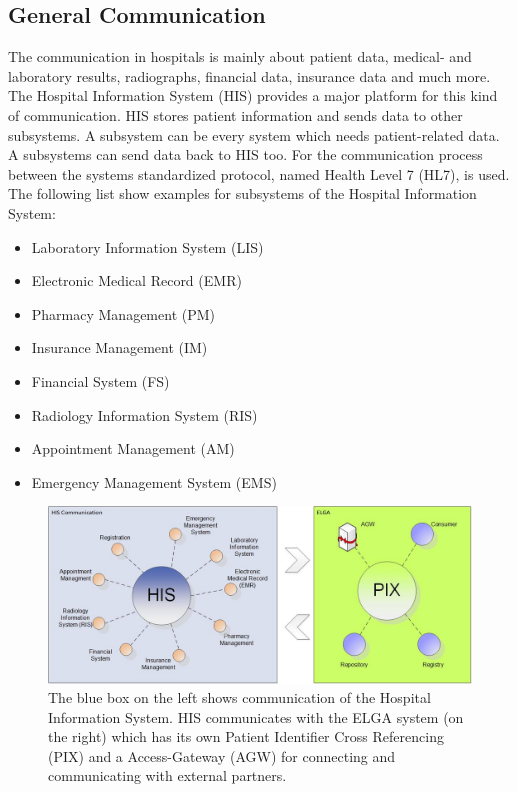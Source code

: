 \documentclass[a4paper]{article}
\begin{document}
	\subsection{General Communication}
		The communication in hospitals is mainly about patient data,
		medical- and laboratory results, radiographs, financial data, insurance
		data and much more. The Hospital Information System (HIS) provides a major
		platform for this kind of communication. HIS stores patient information and
		sends data to other subsystems. A subsystem can be every system which needs
		patient-related data. A subsystems can send data back to HIS too.
		For the communication  process between the systems standardized
		protocol, named Health Level 7 (HL7), is used.\\
		The following list show examples for subsystems of the Hospital
		Information System:
		\begin{itemize}
	    	\item Laboratory Information System (LIS)
	    	\item Electronic Medical Record (EMR)
	    	\item Pharmacy Management (PM)
	    	\item Insurance Management (IM)
	    	\item Financial System (FS)
	    	\item Radiology Information System (RIS)
	    	\item Appointment Management (AM)
	    	\item Emergency Management System (EMS)
	    \end{itemize}
	    \begin{figure}[!ht]
		  \centering
		      \includegraphics[width=1.0\textwidth]{HIS_Overview}
		  \caption{The blue box on the left shows communication of the Hospital
		  Information System. HIS  communicates with the ELGA system
		  (on the right) which has its own Patient Identifier Cross Referencing
		  (PIX) and a Access-Gateway (AGW) for connecting and communicating with
		  external partners.}
		\end{figure}
\end{document}
